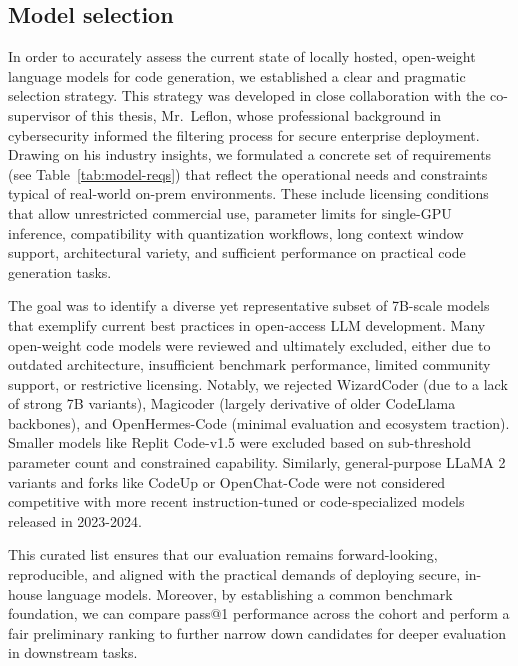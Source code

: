 \subsection{Model selection}
\label{subsection:model-selection}
In order to accurately assess the current state of locally hosted, open-weight language models for code generation, we established a clear and pragmatic selection strategy. This strategy was developed in close collaboration with the co-supervisor of this thesis, Mr.~Leflon, whose professional background in cybersecurity informed the filtering process for secure enterprise deployment. Drawing on his industry insights, we formulated a concrete set of requirements (see Table~\ref{tab:model-reqs}) that reflect the operational needs and constraints typical of real-world on-prem environments. These include licensing conditions that allow unrestricted commercial use, parameter limits for single-GPU inference, compatibility with quantization workflows, long context window support, architectural variety, and sufficient performance on practical code generation tasks.

The goal was  to identify a diverse yet representative subset of 7B-scale models that exemplify current best practices in open-access LLM development.  Many open-weight code models were reviewed and ultimately excluded, either due to outdated architecture, insufficient benchmark performance, limited community support, or restrictive licensing. Notably, we rejected WizardCoder (due to a lack of strong 7B variants), Magicoder (largely derivative of older CodeLlama backbones), and OpenHermes-Code (minimal evaluation and ecosystem traction). Smaller models like Replit Code-v1.5 were excluded based on sub-threshold parameter count and constrained capability. Similarly, general-purpose LLaMA 2 variants and forks like CodeUp or OpenChat-Code were not considered competitive with more recent instruction-tuned or code-specialized models released in 2023-2024.

This curated list ensures that our evaluation remains forward-looking, reproducible, and aligned with the practical demands of deploying secure, in-house language models. Moreover, by establishing a common benchmark foundation, we can compare pass@1 performance across the cohort and perform a fair preliminary ranking to further narrow down candidates for deeper evaluation in downstream tasks.

